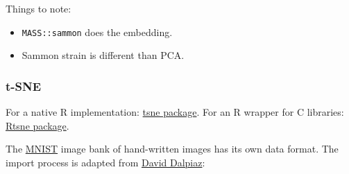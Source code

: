 \documentclass[]{book}
\providecommand{\tightlist}{%
  \setlength{\itemsep}{0pt}\setlength{\parskip}{0pt}}
\theoremstyle{definition}
\theoremstyle{definition}
\theoremstyle{definition}
\theoremstyle{remark}
\begin{document}
Things to note:

\begin{itemize}
\tightlist
\item
  \texttt{MASS::sammon} does the embedding.
\item
  Sammon strain is different than PCA.
\end{itemize}

\subsubsection{t-SNE}\label{t-sne-1}

For a native R implementation:
\href{https://cran.r-project.org/web/packages/tsne/}{tsne package}. For
an R wrapper for C libraries:
\href{https://github.com/jkrijthe/Rtsne}{Rtsne package}.

The \href{http://yann.lecun.com/exdb/mnist/}{MNIST} image bank of
hand-written images has its own data format. The import process is
adapted from
\href{https://gist.github.com/daviddalpiaz/ae62ae5ccd0bada4b9acd6dbc9008706}{David
Dalpiaz}:
\end{document}

